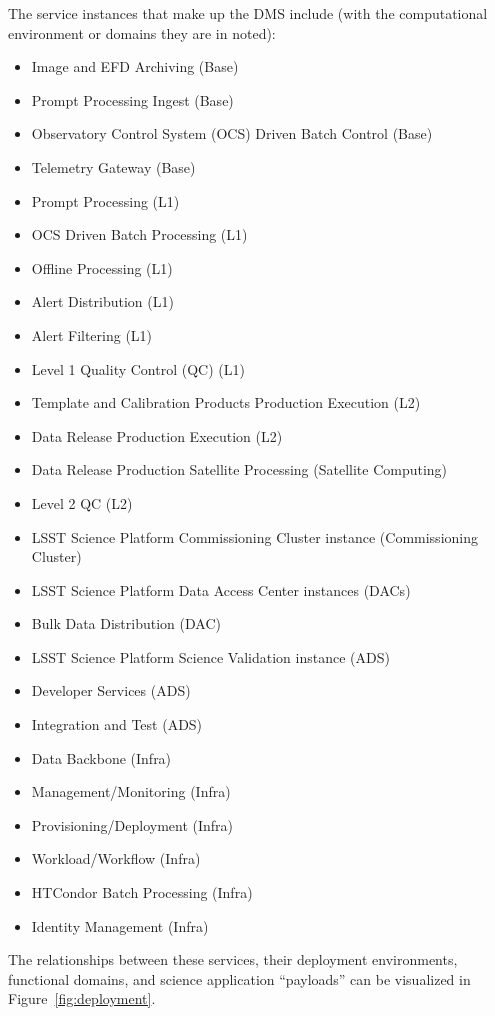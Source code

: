 \documentclass[DM,toc]{lsstdoc}
\begin{document}
The service instances that make up the DMS include (with the
computational environment or domains they are in noted):
\begin{itemize}
\item
  Image and EFD Archiving (Base)
\item
  Prompt Processing Ingest (Base)
\item
  Observatory Control System (OCS) Driven Batch Control (Base)
\item
  Telemetry Gateway (Base)
\item
  Prompt Processing (L1)
\item
  OCS Driven Batch Processing (L1)
\item
  Offline Processing (L1)
\item
  Alert Distribution (L1)
\item
  Alert Filtering (L1)
\item
  Level 1 Quality Control (QC) (L1)
\item
  Template and Calibration Products Production Execution (L2)
\item
  Data Release Production Execution (L2)
\item
  Data Release Production Satellite Processing (Satellite Computing)
\item
  Level 2 QC (L2)
\item
  LSST Science Platform Commissioning Cluster instance (Commissioning
  Cluster)
\item
  LSST Science Platform Data Access Center instances (DACs)
\item
  Bulk Data Distribution (DAC)
\item
  LSST Science Platform Science Validation instance (ADS)
\item
  Developer Services (ADS)
\item
  Integration and Test (ADS)
\item
  Data Backbone (Infra)
\item
  Management/Monitoring (Infra)
\item
  Provisioning/Deployment (Infra)
\item
  Workload/Workflow (Infra)
\item
  HTCondor Batch Processing (Infra)
\item
  Identity Management (Infra)
\end{itemize}

The relationships between these services, their deployment environments,
functional domains, and science application ``payloads'' can be
visualized in Figure~\ref{fig:deployment}.
\end{document}
